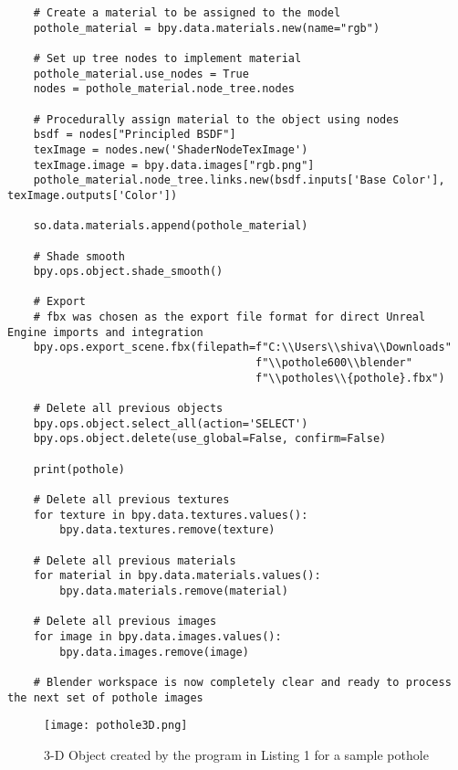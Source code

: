 \documentclass{article}
\begin{document}
\begin{code}
\begin{verbatim}
    # Create a material to be assigned to the model
    pothole_material = bpy.data.materials.new(name="rgb")

    # Set up tree nodes to implement material
    pothole_material.use_nodes = True
    nodes = pothole_material.node_tree.nodes

    # Procedurally assign material to the object using nodes
    bsdf = nodes["Principled BSDF"]
    texImage = nodes.new('ShaderNodeTexImage')
    texImage.image = bpy.data.images["rgb.png"]
    pothole_material.node_tree.links.new(bsdf.inputs['Base Color'], texImage.outputs['Color'])

    so.data.materials.append(pothole_material)

    # Shade smooth
    bpy.ops.object.shade_smooth()
    
    # Export
    # fbx was chosen as the export file format for direct Unreal Engine imports and integration
    bpy.ops.export_scene.fbx(filepath=f"C:\\Users\\shiva\\Downloads"
                                      f"\\pothole600\\blender"
                                      f"\\potholes\\{pothole}.fbx")

    # Delete all previous objects
    bpy.ops.object.select_all(action='SELECT')
    bpy.ops.object.delete(use_global=False, confirm=False)

    print(pothole)

    # Delete all previous textures
    for texture in bpy.data.textures.values():
        bpy.data.textures.remove(texture)

    # Delete all previous materials
    for material in bpy.data.materials.values():
        bpy.data.materials.remove(material)

    # Delete all previous images
    for image in bpy.data.images.values():
        bpy.data.images.remove(image)
    
    # Blender workspace is now completely clear and ready to process the next set of pothole images
\end{verbatim}
\end{code}

\begin{figure}[h!]
    \centering
    \texttt{[image: pothole3D.png]}
    \caption{3-D Object created by the program in Listing 1 for a sample pothole}
    \label{fig:pothole3D}
\end{figure}
\end{document}
